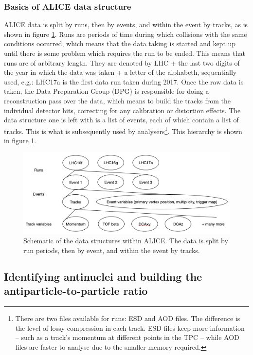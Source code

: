 \subsubsection{Basics of ALICE data structure}
ALICE data is split by runs, then by events, and within the event by tracks, as is shown in figure \ref{fig:ALICE_data_schematic}. Runs are periods of time during which collisions with the same conditions occurred, which means that the data taking is started and kept up until there is some problem which requires the run to be ended. This means that runs are of arbitrary length. They are denoted by LHC + the last two digits of the year in which the data was taken + a letter of the alphabeth, sequentially used, e.g.: LHC17a is the first data run taken during 2017. Once the raw data is taken, the Data Preparation Group (DPG) is responsible for doing a reconstruction pass over the data, which means to build the tracks from the individual detector hits, correcting for any calibration or distortion effects. The data structure  one is left with is a list of events, each of which contain a list of tracks. This is what is subsequently used by analysers\footnote{There are two files available for runs: ESD and AOD files. The difference is the level of lossy compression in each track. ESD files keep more information -- such as a track's momentum at different points in the TPC -- while AOD files are faster to analyse due to the smaller memory required.}. This hierarchy is shown in figure \ref{fig:ALICE_data_schematic}.

\begin{figure}
	\includegraphics[width=\textwidth]{figures/data_structure.png}
	\centering
	\caption{Schematic of the data structures within ALICE. The data is split by run periods, then by event, and within the event by tracks. }
		\label{fig:ALICE_data_schematic}
\end{figure}
\subsection{Identifying antinuclei and building the antiparticle-to-particle ratio}
